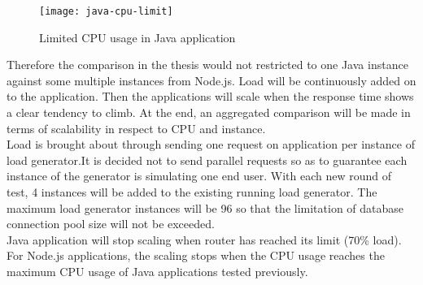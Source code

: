  \begin{figure}[h]
 	\centering
 	\texttt{[image: java-cpu-limit]}
 	\caption{Limited CPU usage in Java application}
 	\label{java-cpu-limit}
 \end{figure}
Therefore the comparison in the thesis would not restricted to one Java instance against some multiple instances from Node.js. Load will be continuously added on to the application. Then the applications will scale when the response time shows a clear tendency to climb. At the end, an aggregated comparison will be made in terms of scalability in respect to CPU and instance. \\
Load is brought about through sending one request on application per instance of load generator.It is decided not to send parallel requests so as to guarantee each instance of the generator is simulating one end user. With each new round of test, 4 instances will be added to the existing running load generator. The maximum load generator instances will be 96 so that the limitation of database connection pool size will not be exceeded.\\
Java application will stop scaling when router has reached its limit (70\% load). For Node.js applications, the scaling stops when the CPU usage reaches the maximum CPU usage of Java applications tested previously.
 
